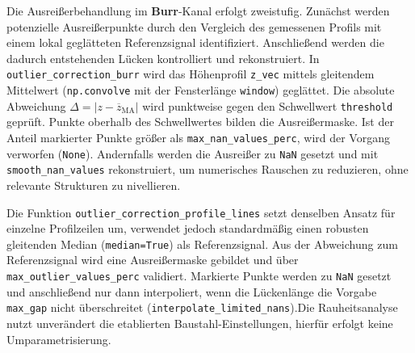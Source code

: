 Die Ausreißerbehandlung im \textbf{Burr}-Kanal erfolgt zweistufig. Zunächst werden potenzielle Ausreißerpunkte durch den Vergleich des gemessenen Profils mit einem lokal geglätteten Referenzsignal identifiziert. Anschließend werden die dadurch entstehenden Lücken kontrolliert und rekonstruiert. In \texttt{outlier\_correction\_burr} wird das Höhenprofil \texttt{z\_vec} mittels gleitendem Mittelwert (\texttt{np.convolve} mit der Fensterlänge \texttt{window}) geglättet. Die absolute Abweichung \(\Delta=\lvert z-\overline{z}_{\text{MA}}\rvert\) wird punktweise gegen den Schwellwert \texttt{threshold} geprüft. Punkte oberhalb des Schwellwertes bilden die Ausreißermaske. Ist der Anteil markierter Punkte größer als \texttt{max\_nan\_values\_perc}, wird der Vorgang verworfen (\texttt{None}). Andernfalls werden die Ausreißer zu \texttt{NaN} gesetzt und mit \texttt{smooth\_nan\_values} rekonstruiert, um numerisches Rauschen zu reduzieren, ohne relevante Strukturen zu nivellieren.

Die Funktion \texttt{outlier\_correction\_profile\_lines} setzt denselben Ansatz für einzelne Profilzeilen um, verwendet jedoch standardmäßig einen robusten gleitenden Median (\texttt{median=True}) als Referenzsignal. Aus der Abweichung zum Referenzsignal wird eine Ausreißermaske gebildet und über \texttt{max\_outlier\_values\_perc} validiert. Markierte Punkte werden zu \texttt{NaN} gesetzt und anschließend nur dann interpoliert, wenn die Lückenlänge die Vorgabe \texttt{max\_gap} nicht überschreitet (\texttt{interpolate\_limited\_nans}).Die Rauheitsanalyse nutzt unverändert die etablierten Baustahl-Einstellungen, hierfür erfolgt keine Umparametrisierung.

